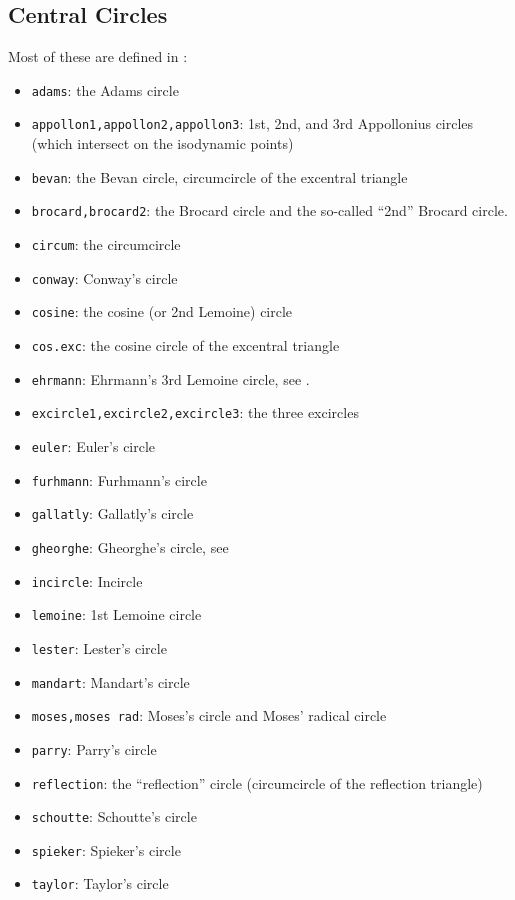 \subsection{Central Circles}

Most of these are defined in \cite[Central Circles]{mw}:

\begin{itemize}
\item \texttt{adams}: the Adams circle
\item \texttt{appollon1,appollon2,appollon3}: 1st, 2nd, and 3rd Appollonius circles (which intersect on the isodynamic points)
\item \texttt{bevan}: the Bevan circle, circumcircle of the excentral triangle
\item \texttt{brocard,brocard2}: the Brocard circle and the so-called ``2nd'' Brocard circle.
\item \texttt{circum}: the circumcircle
\item \texttt{conway}: Conway's circle
\item \texttt{cosine}: the cosine (or 2nd Lemoine) circle 
\item \texttt{cos.exc}: the cosine circle of the excentral triangle
\item \texttt{ehrmann}: Ehrmann's 3rd Lemoine circle, see \cite{darij2012-ehrmann}.
\item \texttt{excircle1,excircle2,excircle3}: the three excircles
\item \texttt{euler}: Euler's circle
\item \texttt{furhmann}: Furhmann's circle
\item \texttt{gallatly}: Gallatly's circle
\item \texttt{gheorghe}: Gheorghe's circle, see \cite[X(649)]{etc}
\item \texttt{incircle}: Incircle
\item \texttt{lemoine}: 1st Lemoine circle
\item \texttt{lester}: Lester's circle
\item \texttt{mandart}: Mandart's circle
\item \texttt{moses,moses rad}: Moses's circle and Moses' radical circle
\item \texttt{parry}: Parry's circle
\item \texttt{reflection}: the ``reflection'' circle (circumcircle of the reflection triangle)
\item \texttt{schoutte}: Schoutte's circle
\item \texttt{spieker}: Spieker's circle
\item \texttt{taylor}: Taylor's circle
\end{itemize}

